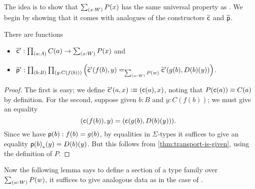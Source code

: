The idea is to show that $\sm{x:W} P(x)$ has the same universal property as \Wtil.
We begin by showing that it comes with analogues of the constructors $\widetilde{\mathsf{c}}$ and $\widetilde{\mathsf{p}}$.

\begin{lem}
  There are functions
  \begin{itemize}
  \item $\cct':\prd{a:A} C(a) \to \sm{x:W} P(x)$ and
  \item $\ppt':\prd{b:B}{y:C(f(b))} \Big(\cct'(f(b),y)=_{\sm{w:W}P(w)}\cct'(g(b),D(b)(y))\Big)$.
  \end{itemize}
\end{lem}
\begin{proof}
  The first is easy; we define $\widetilde{\mathsf{c}}'(a,x) \vcentcolon\equiv (\mathsf{c}(a),x)$, noting that $P(\mathsf{c}(a))\equiv C(a)$ by definition.
  For the second, suppose given $b:B$ and $y:C(f(b))$; we must give an equality
  \[ (\mathsf{c}(f(b)),y) = (\mathsf{c}(g(b),D(b)(y))). \]
  Since we have $\mathsf{p}(b):f(b)=g(b)$, by equalities in $\Sigma$-types it suffices to give an equality ${\mathsf{p}(b)}_{*}\mathopen{}\left({y}\right)\mathclose{} = D(b)(y)$.
  But this follows from \autoref{thm:transport-is-given}, using the definition of $P$.
\end{proof}

Now the following lemma says to define a section of a type family over $\sm{w:W} P(w)$, it suffices to give analogous data as in the case of \Wtil.


